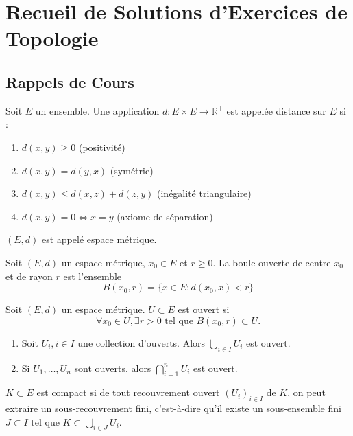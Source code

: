 \documentclass[oneside]{book}
\begin{document}
\sloppy

\chapter*{Recueil de Solutions d'Exercices de Topologie}

\section{Rappels de Cours}

\begin{definition}[Distance]
Soit $E$ un ensemble. Une application $d : E \times E \to \mathbb{R}^+$ est appelée distance sur $E$ si :
\begin{enumerate}
    \item $d(x, y) \geq 0$ (positivité)
    \item $d(x, y) = d(y, x)$ (symétrie)
    \item $d(x, y) \leq d(x, z) + d(z, y)$ (inégalité triangulaire)
    \item $d(x, y) = 0 \Leftrightarrow x = y$ (axiome de séparation)
\end{enumerate}
$(E, d)$ est appelé espace métrique.
\end{definition}

\begin{definition}
Soit $(E, d)$ un espace métrique, $x_0 \in E$ et $r \geq 0$.
La boule ouverte de centre $x_0$ et de rayon $r$ est l'ensemble
    \[
    B(x_0, r) = \{x \in E : d(x_0, x) < r\}
    \]
\end{definition}

\begin{definition}
Soit $(E, d)$ un espace métrique.
$U \subset E$ est ouvert si
    \[
    \forall x_0 \in U, \exists r > 0 \text{ tel que } B(x_0, r) \subset U.
    \]
\end{definition}

\begin{theorem}
\begin{enumerate}
    \item Soit $U_i, i \in I$ une collection d'ouverts. Alors $\bigcup_{i \in I} U_i$ est ouvert.
    \item Si $U_1, \dots, U_n$ sont ouverts, alors $\bigcap_{i=1}^n U_i$ est ouvert.
\end{enumerate}
\end{theorem}

\begin{definition}
$K \subset E$ est compact si de tout recouvrement ouvert $(U_i)_{i \in I}$ de $K$, on peut extraire un sous-recouvrement fini, c'est-à-dire qu'il existe un sous-ensemble fini $J \subset I$ tel que $K \subset \bigcup_{i \in J} U_i$.
\end{definition}
\end{document}
